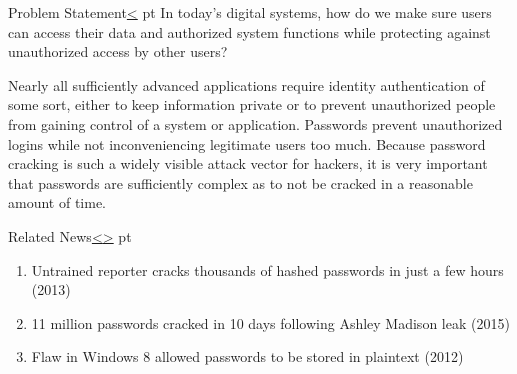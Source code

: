 \documentclass[12pt]{extarticle}
\newenvironment{instructionblock}{\Large\bgroup}{\egroup}
\begin{document}

\pagebreak
\tableofcontents


\pagebreak
{}
\setcounter{section}{1}

\pagebreak
\begin{slide}{Problem Statement}{\hyperref[slide 2]{\textless}}
 pt
\begin{instructionblock}
In today's digital systems, how do we make sure users can access their data and authorized system functions while protecting against unauthorized access by other users?
\end{instructionblock}
\end{slide}

Nearly all sufficiently advanced applications require identity authentication of some sort, either to keep information private or to prevent unauthorized people from gaining control of a system or application. Passwords prevent unauthorized logins while not inconveniencing legitimate users too much. Because password cracking is such a widely visible attack vector for hackers, it is very important that passwords are sufficiently complex as to not be cracked in a reasonable amount of time. 



\pagebreak
\begin{slide}{Related News}{\hyperref[slide 1]{\textless}\hyperref[slide 3]{\textgreater}}
 pt
\begin{instructionblock}
\begin{enumerate}
	\item Untrained reporter cracks thousands of hashed passwords in just a few hours (2013) \cite{ars}
	\item 11 million passwords cracked in 10 days following Ashley Madison leak (2015) \cite{ashley}
	\item Flaw in Windows 8 allowed passwords to be stored in plaintext (2012) \cite{msft}
\end{enumerate}
\end{instructionblock}
\end{slide}
\end{document}
